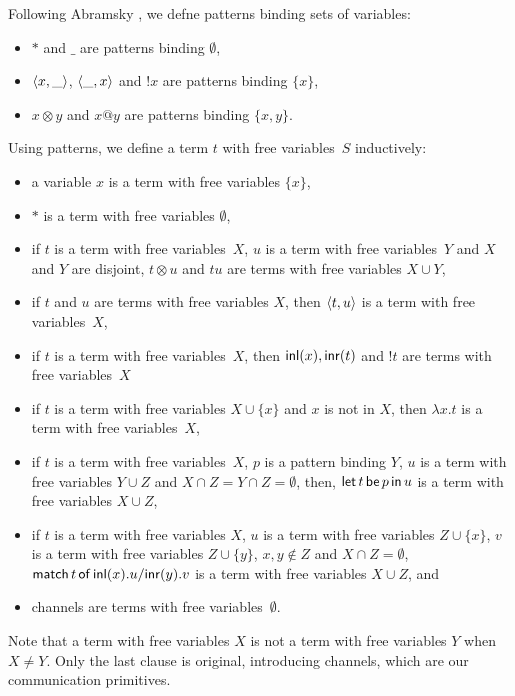 
Following Abramsky , we defne patterns binding sets of
variables:
\begin{itemize}
 \item $\ast$ and $\_$ are patterns binding $\emptyset$,
 \item $\langle{x,\_}\rangle$, $\langle{\_,x}\rangle$ and $!x$ are patterns binding
       $\{x\}$,
 \item $x\otimes y$ and $x@y$ are patterns binding $\{x,y\}$.
\end{itemize}
Using patterns, we define a term $t$ with free variables~$S$ inductively:
\begin{itemize}
 \item a variable $x$ is a term with free variables $\{x\}$,
 \item $\ast$ is a term with free variables $\emptyset$,
 \item if $t$ is a term with free variables~$X$, $u$ is a term with
       free variables~$Y$ and $X$ and $Y$ are disjoint, $t\otimes u$ and
       $tu$ are terms with free variables $X\cup Y$,
 \item if $t$ and $u$ are terms with free variables $X$, then
       $\langle{t,u}\rangle$ is a term with free variables~$X$,
 \item if $t$ is a term with free variables~$X$, then
       $\mathsf{inl}({x}), \mathsf{inr}({t})$ and $!t$ are terms with free variables~$X$
 \item if $t$ is a term with free variables $X\cup \{x\}$ and $x$ is not
       in $X$, then $\lambda x.t$ is a term with free variables~$X$,
 \item if $t$ is a term with free variables~$X$, $p$ is a pattern
       binding $Y$, $u$ is a term with free variables $Y\cup Z$ and
       $X\cap Z = Y\cap Z = \emptyset$, then,
       $\mathsf{let }\,{t}\,\mathsf{ be }\,{p}\,\mathsf{ in }\,{u}$ is a term with free variables $X\cup Z$,
 \item if $t$ is a term with free variables $X$,
       $u$ is a term with free variables $Z\cup \{x\}$,
       $v$ is a term with free variables $Z\cup \{y\}$,
       $x,y\notin Z$ and $X\cap Z = \emptyset$,
       $\mathsf{match}\,{t}\,\mathsf{of}\, \mathsf{inl}({x}). {u}/ \mathsf{inr}({y}). {v}$ is a term with free variables $X\cup Z$, and
 \item channels are terms with free variables~$\emptyset$.
\end{itemize}
Note that a term with free variables $X$ is not a term with free
variables $Y$ when $X\neq Y$.  Only the last clause is original,
introducing channels, which are our communication primitives.

